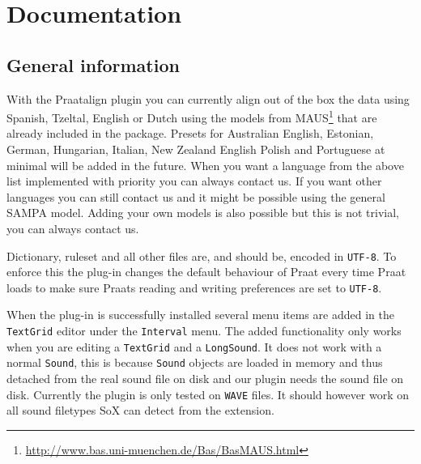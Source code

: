 \chapter{Documentation}
\section{General information}
With the Praatalign plugin you can currently align out of the box the data
using Spanish, Tzeltal, English or Dutch using the models from
MAUS\footnote{\url{http://www.bas.uni-muenchen.de/Bas/BasMAUS.html}} that are
already included in the package. Presets for Australian English, Estonian,
German, Hungarian, Italian, New Zealand English Polish and Portuguese at
minimal will be added in the future. When you want a language from the above
list implemented with priority you can always contact us. If you want other
languages you can still contact us and it might be possible using the general
SAMPA model. Adding your own models is also possible but this is not trivial,
you can always contact us.

Dictionary, ruleset and all other files are, and should be, encoded in
\texttt{UTF-8}. To enforce this the plug-in changes the default behaviour of
Praat every time Praat loads to make sure Praats reading and writing
preferences are set to \texttt{UTF-8}.

When the plug-in is successfully installed several menu items are added in the
\texttt{TextGrid} editor under the \texttt{Interval} menu. The added
functionality only works when you are editing a \texttt{TextGrid} and a
\texttt{LongSound}. It does not work with a normal \texttt{Sound}, this is
because \texttt{Sound} objects are loaded in memory and thus detached from the
real sound file on disk and our plugin needs the sound file on disk. Currently
the plugin is only tested on \texttt{WAVE} files. It should however work on all
sound filetypes SoX can detect from the extension.


